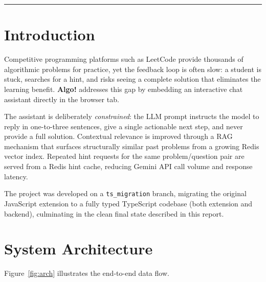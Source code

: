 \documentclass[11pt,a4paper]{article}
\begin{document}
\bigskip\hrule\bigskip

\section{Introduction}

Competitive programming platforms such as LeetCode provide thousands of algorithmic
problems for practice, yet the feedback loop is often slow: a student is stuck,
searches for a hint, and risks seeing a complete solution that eliminates the
learning benefit.  \textbf{Algo!} addresses this gap by embedding an interactive
chat assistant directly in the browser tab.

The assistant is deliberately \emph{constrained}: the LLM prompt instructs the
model to reply in one-to-three sentences, give a single actionable next step, and
never provide a full solution.  Contextual relevance is improved through a RAG
mechanism that surfaces structurally similar past problems from a growing Redis
vector index.  Repeated hint requests for the same problem/question pair are served
from a Redis hint cache, reducing Gemini API call volume and response latency.

The project was developed on a \texttt{ts\_migration} branch, migrating the
original JavaScript extension to a fully typed TypeScript codebase (both extension
and backend), culminating in the clean final state described in this report.

\section{System Architecture}

Figure~\ref{fig:arch} illustrates the end-to-end data flow.
\end{document}
